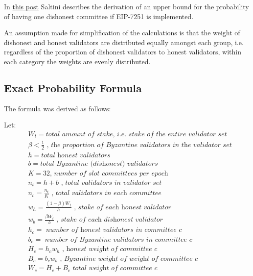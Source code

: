 \documentclass{article}
\begin{document}
In \href{https://notes.ethereum.org/nHqON5l7SACkL_nPwz8Vqw}{this post} Saltini
describes the derivation of an upper bound for the probability of having one
dishonest committee if EIP-7251 is implemented.

An assumption made for simplification of the calculations is that the weight of
dishonest and honest validators are distributed equally amongst each group,
i.e. regardless of the proportion of dishonest validators to honest validators,
within each category the weights are evenly distributed.

\subsection{Exact Probability Formula}
The formula was derived as follows:

\noindent
Let:
\begin{equation*}
\begin{split}
&W_t  = \textit{total amount of stake, i.e. stake of the entire validator set}\\
& \beta  < \frac{1}{2}  \textit{ , the proportion of Byzantine validators in the validator set}\\
& h  = \textit{total honest validators} \\
& b  =  \textit{total Byzantine (dishonest) validators} \\
& K  = 32 \textit{, number of slot committees per epoch} \\
& n_t  = h + b \textit{ , total validators in validator set} \\
& n_c  = \frac{n_t}{K} \textit{ , total validators in each committee} \\
& w_h  = \frac{(1- \beta)W_t}{h} \textit{ , stake of each honest validator }\\
& w_b  = \frac{\beta W_t}{b}  \textit{ , stake of each dishonest validator }\\
& h_c = \textit{ number of honest validators in committee c} \\
& b_c =  \textit{ number of Byzantine validators in committee c} \\
& H_c  = h_c w_h \textit{ , honest weight of committee c} \\
& B_c = b_c w_b \textit{ , Byzantine weight of weight of committee c} \\
& W_c = H_c + B_c \textit{ total weight of committee c} \\
\end{split}
\end{equation*}
\end{document}
